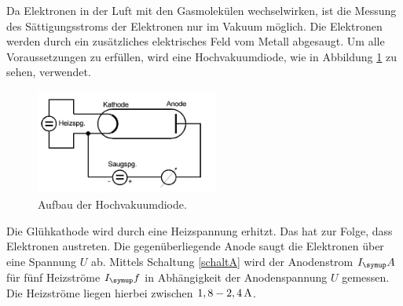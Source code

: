 Da Elektronen in der Luft mit den Gasmolekülen wechselwirken, ist die Messung
des Sättigungsstroms der Elektronen nur im Vakuum möglich.
Die Elektronen werden durch ein zusätzliches elektrisches Feld vom Metall abgesaugt.
Um alle Voraussetzungen zu erfüllen, wird eine Hochvakuumdiode, wie in
Abbildung \ref{aufbau} zu sehen, verwendet.

\begin{figure}
  \includegraphics[width=6cm]{bilder/aufbau.jpg}
  \caption{Aufbau der Hochvakuumdiode. \cite{504}}
  \label{aufbau}
\end{figure}
Die Glühkathode wird durch eine Heizspannung erhitzt. Das hat zur Folge, dass
Elektronen austreten. Die gegenüberliegende Anode saugt die Elektronen über eine
Spannung $U$ ab.
Mittels Schaltung \ref{schaltA} wird der Anodenstrom $I_\su{A}$ für fünf
Heizströme $I_\su{f}$ in Abhängigkeit der Anodenspannung $U$ gemessen. Die Heizströme
liegen hierbei zwischen $1,8-2,4\,\si{\ampere}$.

